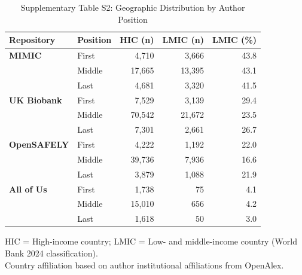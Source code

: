 \begin{table}[htbp]
\centering
\caption{Supplementary Table S2: Geographic Distribution by Author Position}
\label{tab:income_position}
\begin{tabular}{llrrr}
\toprule
Repository & Position & HIC (n) & LMIC (n) & LMIC (\%) \\
\midrule
\textbf{MIMIC} & First  & 4,710  & 3,666  & 43.8 \\
               & Middle & 17,665 & 13,395 & 43.1 \\
               & Last   & 4,681  & 3,320  & 41.5 \\
\addlinespace
\textbf{UK Biobank} & First  & 7,529  & 3,139  & 29.4 \\
                    & Middle & 70,542 & 21,672 & 23.5 \\
                    & Last   & 7,301  & 2,661  & 26.7 \\
\addlinespace
\textbf{OpenSAFELY} & First  & 4,222  & 1,192  & 22.0 \\
                    & Middle & 39,736 & 7,936  & 16.6 \\
                    & Last   & 3,879  & 1,088  & 21.9 \\
\addlinespace
\textbf{All of Us}  & First  & 1,738  & 75     & 4.1 \\
                    & Middle & 15,010 & 656    & 4.2 \\
                    & Last   & 1,618  & 50     & 3.0 \\
\bottomrule
\end{tabular}

\smallskip
\footnotesize
HIC = High-income country; LMIC = Low- and middle-income country (World Bank 2024 classification). \\
Country affiliation based on author institutional affiliations from OpenAlex.
\end{table}



